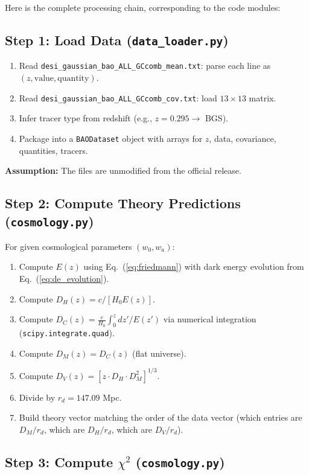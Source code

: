 \documentclass[11pt,a4paper]{article}
\begin{document}
Here is the complete processing chain, corresponding to the code modules:

\subsection{Step 1: Load Data (\texttt{data\_loader.py})}

\begin{enumerate}
    \item Read \texttt{desi\_gaussian\_bao\_ALL\_GCcomb\_mean.txt}: parse each line as $(z, \text{value}, \text{quantity})$.
    \item Read \texttt{desi\_gaussian\_bao\_ALL\_GCcomb\_cov.txt}: load $13 \times 13$ matrix.
    \item Infer tracer type from redshift (e.g., $z = 0.295 \to$ BGS).
    \item Package into a \texttt{BAODataset} object with arrays for $z$, data, covariance, quantities, tracers.
\end{enumerate}

\textbf{Assumption:} The files are unmodified from the official release.

\subsection{Step 2: Compute Theory Predictions (\texttt{cosmology.py})}

For given cosmological parameters $(w_0, w_a)$:
\begin{enumerate}
    \item Compute $E(z)$ using Eq.~(\ref{eq:friedmann}) with dark energy evolution from Eq.~(\ref{eq:de_evolution}).
    \item Compute $D_H(z) = c / [H_0 E(z)]$.
    \item Compute $D_C(z) = \frac{c}{H_0}\int_0^z dz'/E(z')$ via numerical integration (\texttt{scipy.integrate.quad}).
    \item Compute $D_M(z) = D_C(z)$ (flat universe).
    \item Compute $D_V(z) = [z \cdot D_H \cdot D_M^2]^{1/3}$.
    \item Divide by $r_d = 147.09$ Mpc.
    \item Build theory vector matching the order of the data vector (which entries are $D_M/r_d$, which are $D_H/r_d$, which are $D_V/r_d$).
\end{enumerate}

\subsection{Step 3: Compute $\chi^2$ (\texttt{cosmology.py})}
\end{document}
